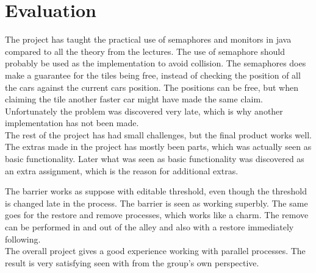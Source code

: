\section{Evaluation}
The project has taught the practical use of semaphores and monitors in java compared to all the theory from the lectures. The use of semaphore should probably be used as the implementation to avoid collision. The semaphores does make a guarantee for the tiles being free, instead of checking the position of all the cars against the current cars position. The positions can be free, but when claiming the tile another faster car might have made the same claim. Unfortunately the problem was discovered very late, which is why another implementation has not been made.
\\

The rest of the project has had small challenges, but the final product works well. The extras made in the project has mostly been parts, which was actually seen as basic functionality. Later what was seen as basic functionality was discovered as an extra assignment, which is the reason for additional extras. 

The barrier works as suppose with editable threshold, even though the threshold is changed late in the process. The barrier is seen as working superbly. The same goes for the restore and remove processes, which works like a charm. The remove can be performed in and out of the alley and also with a restore immediately following.
\\

The overall project gives a good experience working with parallel processes. The result is very satisfying seen with from the group's own perspective.